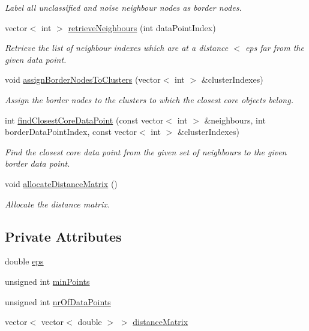 \begin{DoxyCompactItemize}
\begin{DoxyCompactList}\small\item\em \-Label all unclassified and noise neighbour nodes as border nodes. \end{DoxyCompactList}\item 
vector$<$ int $>$ \hyperlink{classmultiscale_1_1analysis_1_1DBSCAN_a2524149cf55398e2038aaa389b56bfec}{retrieve\-Neighbours} (int data\-Point\-Index)
\begin{DoxyCompactList}\small\item\em \-Retrieve the list of neighbour indexes which are at a distance $<$ eps far from the given data point. \end{DoxyCompactList}\item 
void \hyperlink{classmultiscale_1_1analysis_1_1DBSCAN_a1c55a2e893f28de4a68129407c55d5f3}{assign\-Border\-Nodes\-To\-Clusters} (vector$<$ int $>$ \&cluster\-Indexes)
\begin{DoxyCompactList}\small\item\em \-Assign the border nodes to the clusters to which the closest core objects belong. \end{DoxyCompactList}\item 
int \hyperlink{classmultiscale_1_1analysis_1_1DBSCAN_a7a1c95e78edf9e804a7809648e130bda}{find\-Closest\-Core\-Data\-Point} (const vector$<$ int $>$ \&neighbours, int border\-Data\-Point\-Index, const vector$<$ int $>$ \&cluster\-Indexes)
\begin{DoxyCompactList}\small\item\em \-Find the closest core data point from the given set of neighbours to the given border data point. \end{DoxyCompactList}\item 
void \hyperlink{classmultiscale_1_1analysis_1_1DBSCAN_af50079a4d370fb35b13b0a1557a454f0}{allocate\-Distance\-Matrix} ()
\begin{DoxyCompactList}\small\item\em \-Allocate the distance matrix. \end{DoxyCompactList}\end{DoxyCompactItemize}
\subsection*{\-Private \-Attributes}
\begin{DoxyCompactItemize}
\item 
double \hyperlink{classmultiscale_1_1analysis_1_1DBSCAN_a8d68cd84561cbb06bd138f8edf340b9f}{eps}
\item 
unsigned int \hyperlink{classmultiscale_1_1analysis_1_1DBSCAN_a7bafd4070ac44e236fcc7f06d92b6572}{min\-Points}
\item 
unsigned int \hyperlink{classmultiscale_1_1analysis_1_1DBSCAN_af81a42ca24493494b3d20e27c76be016}{nr\-Of\-Data\-Points}
\item 
vector$<$ vector$<$ double $>$ $>$ \hyperlink{classmultiscale_1_1analysis_1_1DBSCAN_a863a8b90ff30d401795264a246a09147}{distance\-Matrix}
\end{DoxyCompactItemize}


